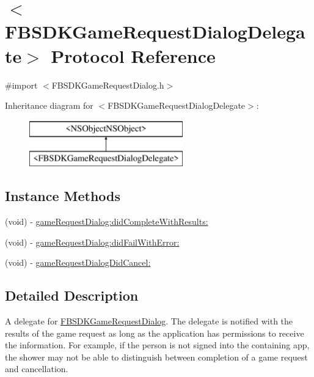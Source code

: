 \hypertarget{protocol_f_b_s_d_k_game_request_dialog_delegate-p}{}\section{$<$F\+B\+S\+D\+K\+Game\+Request\+Dialog\+Delegate$>$ Protocol Reference}
\label{protocol_f_b_s_d_k_game_request_dialog_delegate-p}


{\ttfamily \#import $<$F\+B\+S\+D\+K\+Game\+Request\+Dialog.\+h$>$}

Inheritance diagram for $<$F\+B\+S\+D\+K\+Game\+Request\+Dialog\+Delegate$>$\+:\begin{figure}[H]
\begin{center}
\leavevmode
\includegraphics[height=2.000000cm]{protocol_f_b_s_d_k_game_request_dialog_delegate-p}
\end{center}
\end{figure}
\subsection*{Instance Methods}
\begin{DoxyCompactItemize}
\item 
(void) -\/ \hyperlink{protocol_f_b_s_d_k_game_request_dialog_delegate-p_afedbb044e8be74848fb18286f1e29ebc}{game\+Request\+Dialog\+:did\+Complete\+With\+Results\+:}
\item 
(void) -\/ \hyperlink{protocol_f_b_s_d_k_game_request_dialog_delegate-p_a6a5f81ed9ea90d242df2c6ee75911d4b}{game\+Request\+Dialog\+:did\+Fail\+With\+Error\+:}
\item 
(void) -\/ \hyperlink{protocol_f_b_s_d_k_game_request_dialog_delegate-p_ab88e9ddb51341468fca4c4131f614b69}{game\+Request\+Dialog\+Did\+Cancel\+:}
\end{DoxyCompactItemize}


\subsection{Detailed Description}
A delegate for \hyperlink{interface_f_b_s_d_k_game_request_dialog}{F\+B\+S\+D\+K\+Game\+Request\+Dialog}.  The delegate is notified with the results of the game request as long as the application has permissions to receive the information. For example, if the person is not signed into the containing app, the shower may not be able to distinguish between completion of a game request and cancellation. 

